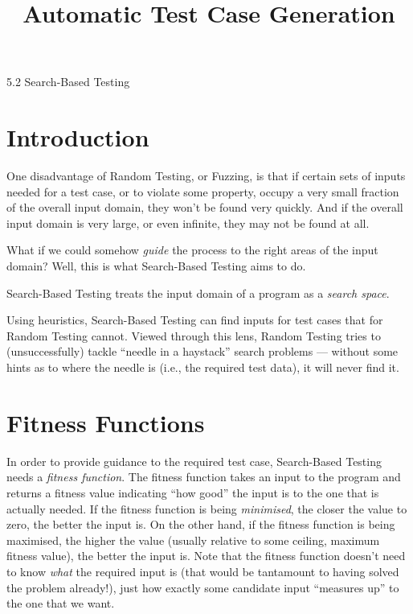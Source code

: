 



\title{Automatic Test Case Generation}{5.2 Search-Based Testing}

\section{Introduction}


One disadvantage of Random Testing, or Fuzzing, is that if certain sets of
inputs needed for a test case, or to violate some property, occupy a very small
fraction of the overall input domain, they won't be found very quickly. And if
the overall input domain is very large, or even infinite, they may not be found
at all.


What if we could somehow {\it guide} the process to the right areas of the input
domain? Well, this is what Search-Based Testing aims to do. 


Search-Based Testing treats the input domain of a program as a {\it search
space}. 


Using heuristics, Search-Based Testing can find inputs for test cases that for
Random Testing cannot. Viewed through this lens, Random Testing tries to
(unsuccessfully) tackle ``needle in a haystack'' search problems --- without
some hints as to where the needle is (i.e., the required test data), it will
never find it.

\section{Fitness Functions}
In order to provide guidance to the required test case, Search-Based Testing
needs a {\it fitness function}. The fitness function takes an input to the
program and returns a {fitness value} indicating ``how good'' the input is to
the one that is actually needed. If the fitness function is being {\it
minimised}, the closer the value to zero, the better the input is. On the other
hand, if the fitness function is being maximised, the higher the value (usually
relative to some ceiling, maximum fitness value), the better the input is.
%
Note that the fitness function doesn't need to know {\it what} the required
input is (that would be tantamount to having solved the problem already!), just
how exactly some candidate input ``measures up'' to the one that we want.

